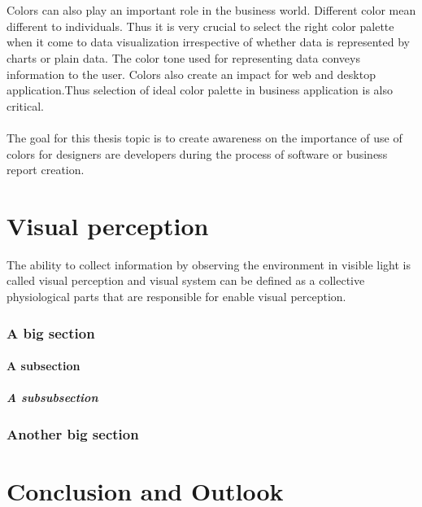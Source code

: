 \documentclass[a4paper, 12pt,oneside]{article}
\begin{document}
\\
\\
Colors can also play an important role in the business world. Different color mean different to individuals. Thus it is very crucial to select the right color palette when it come to data visualization irrespective of whether data is represented by charts or plain data. The color tone used for representing data conveys information to the user. Colors also create an impact for web and desktop application.Thus selection of ideal color palette in business application is also critical.
\\
\\
The goal for this thesis topic is to create awareness on the importance of use of colors for designers are developers during the process of software or business report creation.





\pagebreak
\part{Visual perception}
The ability to collect information by observing the environment in visible light is called visual perception and visual system can be defined as a collective physiological parts that are responsible for enable visual perception.



\section{A big section}


\subsection{A subsection}

\subsubsection{A subsubsection}


\section{Another big section}



\pagebreak
\part{Conclusion and Outlook}
\end{document}

